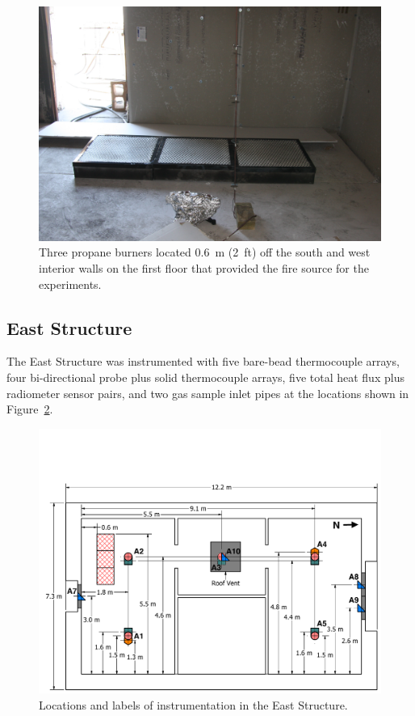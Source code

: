 \begin{figure}[!h]
	\centering
	\includegraphics[width=0.9\columnwidth]{Figures/Pictures/burners}
	\caption[Three propane burners used as the fuel source]{Three propane burners located 0.6~m (2~ft) off the south and west interior walls on the first floor that provided the fire source for the experiments.}
	\label{fig:burners}
\end{figure}

\subsection{East Structure}

The East Structure was instrumented with five bare-bead thermocouple arrays, four bi-directional probe plus solid thermocouple arrays, five total heat flux plus radiometer sensor pairs, and two gas sample inlet pipes at the locations shown in Figure~\ref{fig:east_instrumentation}.

\begin{figure}[!h]
	\centering
	\includegraphics[width=\columnwidth]{Figures/Floor_Plans/East_Structure_Dimensioned_Instrumentation}
	\caption[Locations and labels of instrumentation in the East Structure]{Locations and labels of instrumentation in the East Structure.}
	\label{fig:east_instrumentation}
\end{figure}

